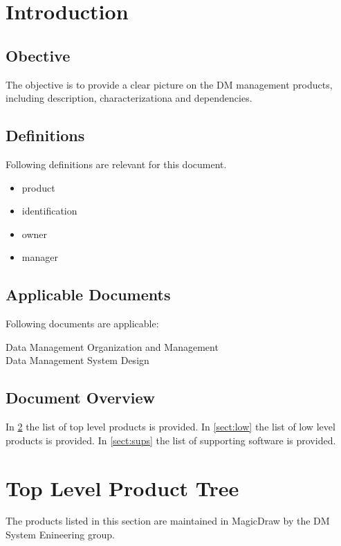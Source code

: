 \section{Introduction}

\subsection{Obective}

The objective is to provide a clear picture on the DM management products, including description, characterizationa and dependencies.

\subsection{Definitions}

Following definitions are relevant for this document.

\begin{itemize}
\item product
\item identification
\item owner
\item manager
\end{itemize}

\subsection{Applicable Documents}

Following documents are applicable:

 Data Management Organization and Management\\
 Data Management System Design

\subsection{Document Overview}

In \ref{sect:top} the list of top level products is provided.
In \ref{sect:low} the list of low level products is provided.
In \ref{sect:sups} the list of supporting software is provided.


\newpage
\section{Top Level Product Tree}\label{sect:top}

The products listed in this section are maintained in MagicDraw by the DM System Enineering group. 

